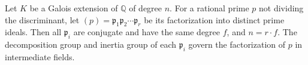Let $K$ be a Galois extension of $\mathbb{Q}$ of degree $n$. For a rational prime $p$ not dividing the discriminant, let $(p) = \mathfrak{p}_1 \mathfrak{p}_2 \cdots \mathfrak{p}_r$ be its factorization into distinct prime ideals. Then all $\mathfrak{p}_i$ are conjugate and have the same degree $f$, and $n = r \cdot f$. The decomposition group and inertia group of each $\mathfrak{p}_i$ govern the factorization of $p$ in intermediate fields.
